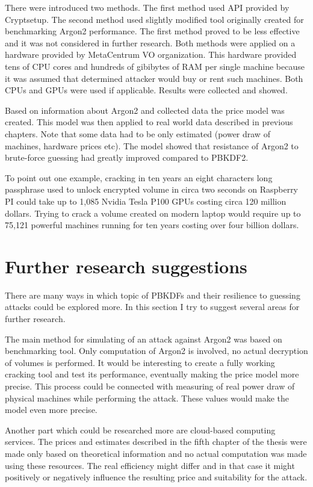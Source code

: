 \documentclass[nolof,digital]{fithesis3}
\begin{document}
There were introduced two methods. The first method used API provided by Cryptsetup. The second method used slightly modified tool originally created for benchmarking Argon2 performance. The first method proved to be less effective and it was not considered in further research. Both methods were applied on a hardware provided by MetaCentrum VO organization. This hardware provided tens of CPU cores and hundreds of gibibytes of RAM per single machine because it was assumed that determined attacker would buy or rent such machines. Both CPUs and GPUs were used if applicable. Results were collected and showed.

Based on information about Argon2 and collected data the price model was created. This model was then applied to real world data described in previous chapters. Note that some data had to be only estimated (power draw of machines, hardware prices etc). The model showed that resistance of Argon2 to brute-force guessing had greatly improved compared to PBKDF2.

To point out one example, cracking in ten years an eight characters long passphrase used to unlock encrypted volume in circa two seconds on Raspberry PI could take up to 1,085 Nvidia Tesla P100 GPUs costing circa 120 million dollars. Trying to crack a volume created on modern laptop would require up to 75,121 powerful machines running for ten years costing over four billion dollars.

\section{Further research suggestions}
There are many ways in which topic of PBKDFs and their resilience to guessing attacks could be explored more. In this section I try to suggest several areas for further research.

The main method for simulating of an attack against Argon2 was based on benchmarking tool. Only computation of Argon2 is involved, no actual decryption of volumes is performed. It would be interesting to create a fully working cracking tool and test its performance, eventually making the price model more precise. This process could be connected with measuring of real power draw of physical machines while performing the attack. These values would make the model even more precise.

Another part which could be researched more are cloud-based computing services. The prices and estimates described in the fifth chapter of the thesis were made only based on theoretical information and no actual computation was made using these resources. The real efficiency might differ and in that case it might positively or negatively influence the resulting price and suitability for the attack.
\end{document}
